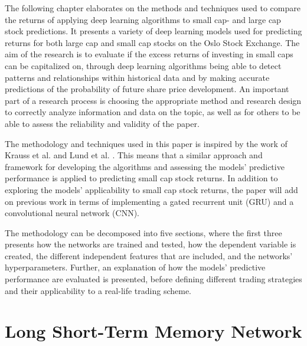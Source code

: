 The following chapter elaborates on the methods and techniques used to compare the returns of applying deep learning algorithms to small cap- and large cap stock predictions. It presents a variety of deep learning models used for predicting returns for both large cap and small cap stocks on the Oslo Stock Exchange. The aim of the research is to evaluate if the excess returns of investing in small caps can be capitalized on, through deep learning algorithms being able to detect patterns and relationships within historical data and by making accurate predictions of the probability of future share price development. An important part of a research process is choosing the appropriate method and research design to correctly analyze information and data on the topic, as well as for others to be able to assess the reliability and validity of the paper. 

\indent\newline
The methodology and techniques used in this paper is inspired by the work of Krauss et al. and Lund et al. \cite{krauss} \cite{lund}. This means that a similar approach and framework for developing the algorithms and assessing the models' predictive performance is applied to predicting small cap stock returns. In addition to exploring the models' applicability to small cap stock returns, the paper will add on previous work in terms of implementing a gated recurrent unit (GRU) and a convolutional neural network (CNN).   

\indent\newline
The methodology can be decomposed into five sections, where the first three presents how the networks are trained and tested, how the dependent variable is created, the different independent features that are included, and the networks' hyperparameters. Further, an explanation of how the models' predictive performance are evaluated is presented, before defining different trading strategies and their applicability to a real-life trading scheme.  

\section{Long Short-Term Memory Network}


